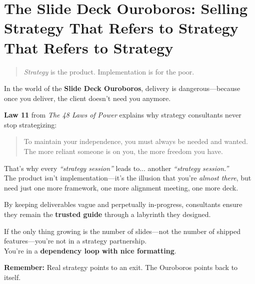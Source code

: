 \section{The Slide Deck Ouroboros: Selling Strategy That Refers to Strategy That Refers to Strategy}

\begin{quote}
\textit{Strategy} is the product. Implementation is for the poor.
\end{quote}

  In the world of the \textbf{Slide Deck Ouroboros}, delivery is dangerous—because once you deliver, the client doesn’t need you anymore.
  
  \medskip
  
  \textbf{Law 11} from \textit{The 48 Laws of Power} explains why strategy consultants never stop strategizing:
  \begin{quote}
    To maintain your independence, you must always be needed and wanted. The more reliant someone is on you, the more freedom you have.
  \end{quote}
  
  \medskip
  
  That’s why every \textit{``strategy session''} leads to... another \textit{``strategy session.''} \\
  The product isn’t implementation—it’s the illusion that you’re \textit{almost there}, but need just one more framework, one more alignment meeting, one more deck.
  
  \medskip
  
  By keeping deliverables vague and perpetually in-progress, consultants ensure they remain the \textbf{trusted guide} through a labyrinth they designed.
  
  \medskip
  
  If the only thing growing is the number of slides—not the number of shipped features—you’re not in a strategy partnership. \\
  You’re in a \textbf{dependency loop with nice formatting}.
  
  \medskip
  
  \textbf{Remember:} Real strategy points to an exit. The Ouroboros points back to itself.
  




